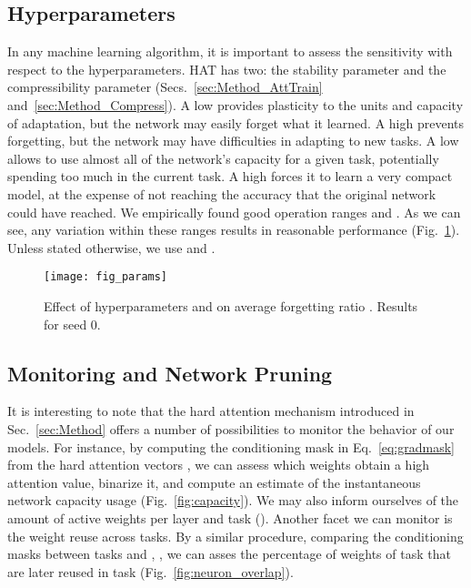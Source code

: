 \subsection{Hyperparameters}
\label{sec:Exper_Param}

In any machine learning algorithm, it is important to assess the sensitivity with respect to the hyperparameters. HAT has two: the stability parameter  and the compressibility parameter  (Secs.~\ref{sec:Method_AttTrain} and~\ref{sec:Method_Compress}). A low  provides plasticity to the units and capacity of adaptation, but the network may easily forget what it learned. A high  prevents forgetting, but the network may have difficulties in adapting to new tasks. A low  allows to use almost all of the network's capacity for a given task, potentially spending too much in the current task. A high  forces it to learn a very compact model, at the expense of not reaching the accuracy that the original network could have reached. We empirically found good operation ranges  and . As we can see, any variation within these ranges results in reasonable performance (Fig.~\ref{fig:params}). Unless stated otherwise, we use  and .

\begin{figure}[t]
\begin{center}
	\texttt{[image: fig\_params]}
\vskip -0.15in
	\caption{Effect of hyperparameters  and  on average forgetting ratio . Results for seed 0.}
	\label{fig:params}
	\end{center}
	\vskip -0.1in
\end{figure} 

\subsection{Monitoring and Network Pruning}
\label{sec:Exper_Monitor}

It is interesting to note that the hard attention mechanism introduced in Sec.~\ref{sec:Method} offers a number of possibilities to monitor the behavior of our models. For instance, by computing the conditioning mask in Eq.~\ref{eq:gradmask} from the hard attention vectors , we can assess which weights obtain a high attention value, binarize it, and compute an estimate of the instantaneous network capacity usage (Fig.~\ref{fig:capacity}). We may also inform ourselves of the amount of active weights per layer and task (). Another facet we can monitor is the weight reuse across tasks. By a similar procedure, comparing the conditioning masks between tasks  and , , we can asses the percentage of weights of task  that are later reused in task  (Fig.~\ref{fig:neuron_overlap}).

